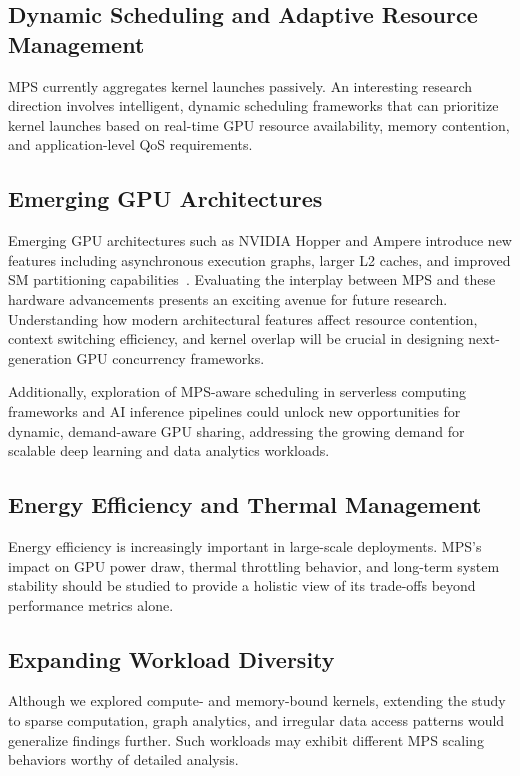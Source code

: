 \documentclass[sigconf,nonacm]{acmart}
\begin{document}
\subsection{Dynamic Scheduling and Adaptive Resource Management}

MPS currently aggregates kernel launches passively. An interesting research direction involves intelligent, dynamic scheduling frameworks that can prioritize kernel launches based on real-time GPU resource availability, memory contention, and application-level QoS requirements.

\subsection{Emerging GPU Architectures}

Emerging GPU architectures such as NVIDIA Hopper and Ampere introduce new features including asynchronous execution graphs, larger L2 caches, and improved SM partitioning capabilities~\cite{nvidia_hopper_whitepaper, nvidia_ampere_whitepaper}. Evaluating the interplay between MPS and these hardware advancements presents an exciting avenue for future research. Understanding how modern architectural features affect resource contention, context switching efficiency, and kernel overlap will be crucial in designing next-generation GPU concurrency frameworks.

Additionally, exploration of MPS-aware scheduling in serverless computing frameworks and AI inference pipelines could unlock new opportunities for dynamic, demand-aware GPU sharing, addressing the growing demand for scalable deep learning and data analytics workloads.


\subsection{Energy Efficiency and Thermal Management}

Energy efficiency is increasingly important in large-scale deployments. MPS’s impact on GPU power draw, thermal throttling behavior, and long-term system stability should be studied to provide a holistic view of its trade-offs beyond performance metrics alone.

\subsection{Expanding Workload Diversity}

Although we explored compute- and memory-bound kernels, extending the study to sparse computation, graph analytics, and irregular data access patterns would generalize findings further. Such workloads may exhibit different MPS scaling behaviors worthy of detailed analysis.
\end{document}

